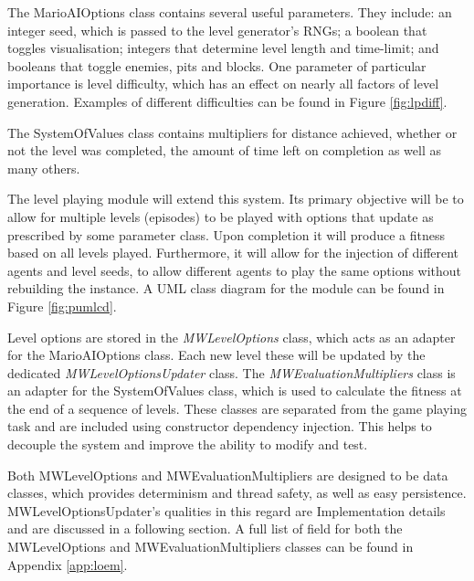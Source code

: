 The MarioAIOptions class contains several useful parameters. They include: an integer seed, which is passed to the level generator's RNGs; a boolean that toggles visualisation; integers that determine level length and time-limit; and booleans that toggle enemies, pits and blocks. One parameter of particular importance is level difficulty, which has an effect on nearly all factors of level generation. Examples of different difficulties can be found in Figure \ref{fig:lpdiff}. 

The SystemOfValues class contains multipliers for  distance achieved, whether or not the level was completed, the amount of time left on completion as well as many others.

\vspace{\baselineskip}

The level playing module will extend this system. Its primary objective will be to allow for multiple levels (episodes) to be played with options that update as prescribed by some parameter class. Upon completion it will produce a fitness based on all levels played. Furthermore, it will allow for the injection of different agents and level seeds, to allow different agents to play the same options without rebuilding the instance. A UML class diagram for the module can be found in Figure \ref{fig:pumlcd}.

Level options are stored in the \emph{MWLevelOptions} class, which acts as an adapter for the MarioAIOptions class. Each new level these will be updated by the dedicated \emph{MWLevelOptionsUpdater} class. The \emph{MWEvaluationMultipliers} class is an adapter for the SystemOfValues class, which is used to calculate the fitness at the end of a sequence of levels. These classes are separated from the game playing task and are included using constructor dependency injection. This helps to decouple the system and improve the ability to modify and test.

Both MWLevelOptions and MWEvaluationMultipliers are designed to be data classes, which provides determinism and thread safety, as well as easy persistence. MWLevelOptionsUpdater's qualities in this regard are Implementation details and are discussed in a following section. A full list of field for both the MWLevelOptions and MWEvaluationMultipliers classes can be found in Appendix \ref{app:loem}.



